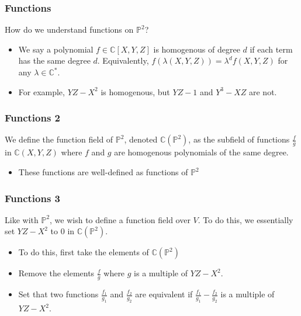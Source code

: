\documentclass{beamer}
\theoremstyle{definition}
\begin{document}
\begin{frame}
    \frametitle{Functions}

    How do we understand functions on \(\mathbb{P}^2\)?
    \begin{itemize}
\item[\textrightarrow]
    We say a polynomial \(f\in \mathbb{C}[X, Y, Z]\) is homogenous of degree \(d\) if each term has the same degree \(d\). Equivalently, \(f(\lambda(X, Y, Z)) = \lambda^d f(X, Y, Z)\) for any \(\lambda\in\mathbb{C}^\ast\).

\item[\textrightarrow] For example, \(YZ - X^2\) is homogenous, but \(YZ - 1\) and \(Y^3 - XZ\) are not.

\end{itemize}
\end{frame}
\begin{frame}
    \frametitle{Functions 2}
    We define the function field of \(\mathbb{P}^2\), denoted \(\mathbb{C}(\mathbb{P}^2)\), as the subfield of functions \( \frac{f}{g}\) in \(\mathbb{C}(X, Y, Z)\) where \(f\) and \(g\) are homogenous polynomials of the same degree.
    \begin{itemize}
        \item[\textrightarrow] These functions are well-defined as functions of \(\mathbb{P}^2\)
        
    \end{itemize}



\end{frame}

\begin{frame}
    \frametitle{Functions 3}
    Like with \(\mathbb{P}^2\), we wish to define a function field over \(V\). To do this, we essentially set \(YZ - X^2\) to \(0\) in \(\mathbb{C}(\mathbb{P}^2)\).
    \begin{itemize}
        \item[\textrightarrow] To do this, first take the elements of \(\mathbb{C}(\mathbb{P}^2)\)
        \item[\textrightarrow] Remove the elements \( \frac{f}{g}\) where \(g\) is a multiple of \(YZ - X^2\).
        \item[\textrightarrow] Set that two functions \( \frac{f_1}{g_1}\) and \( \frac{f_2}{g_2}\) are equivalent if \( \frac{f_1}{g_1} - \frac{f_2}{g_2}\) is a multiple of \(YZ - X^2\). %
        
    \end{itemize}
       \end{frame}
\end{document}
